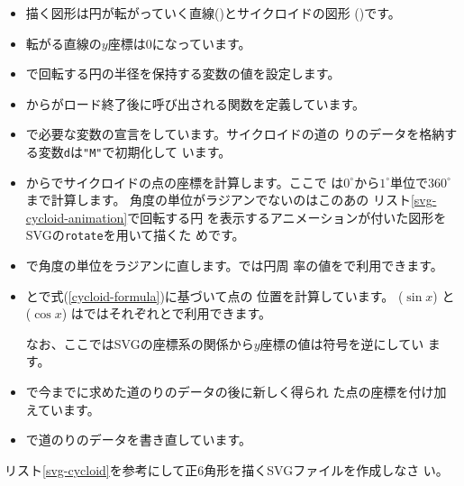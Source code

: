 \begin{itemize}
 \item 描く図形は円が転がっていく直線()とサイクロイドの図形
       ()です。
 \item 転がる直線の$y$座標は$0$になっています。
 \item {}で回転する円の半径を保持する変数の値を設定します。
 \item {}から\SVG がロード終了後に呼び出される関数を定義しています。
 \item {}で必要な変数の宣言をしています。サイクロイドの道の
       りのデータを格納する変数\texttt{d}は\texttt{"M"}で初期化して
       います。
 \item {}からでサイクロイドの点の座標を計算します。ここで
は$0^{\circ}$から$1^{\circ}$単位で$360^{\circ}$まで計算します。
角度の単位がラジアンでないのはこのあの
リスト\ref{svg-cycloid-animation}で回転する円
を表示するアニメーションが付いた図形をSVGの\texttt{rotate}を用いて描くた
めです。
 \item {}で角度の単位をラジアンに直します。\JS では円周
       率の値をで利用できます。
 \item {}とで式(\ref{cycloid-formula})に基づいて点の
       位置を計算しています。
       ($\sin{x}$)
       と($\cos{x}$)
			 は\JS ではそれぞれとで利用できます。

       なお、ここではSVGの座標系の関係から$y$座標の値は符号を逆にしてい
       ます。
 \item {}で今までに求めた道のりのデータの後に新しく得られ
       た点の座標を付け加えています。
 \item {}で道のりのデータを書き直しています。
\end{itemize}
\begin{Problem}\upshape
 リスト\ref{svg-cycloid}を参考にして正6角形を描くSVGファイルを作成しなさ
 い。
\end{Problem}